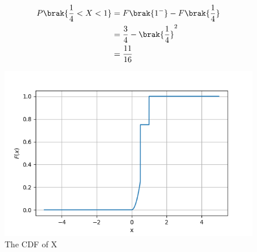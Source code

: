 
\begin{align}
    P\brak{\frac{1}{4} < X < 1} &= F\brak{1^{-}}-F\brak{\frac{1}{4}} \\
    &= \frac{3}{4} - \brak{\frac{1}{4}}^{2}\\
    &= \frac{11}{16}
\end{align}
\begin{figure}[!ht]
\centering
\includegraphics[width=\columnwidth]{solutions/ma/2016/30/figs/Assignment4_CDF.png}
\caption{The CDF of X}
\label{cdf}
\end{figure}


